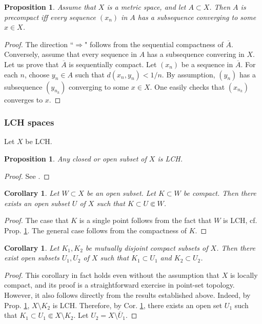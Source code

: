 \documentclass[12pt,b5paper,notitlepage]{article}
\theoremstyle{definition}
\theoremstyle{plain}
\newtheorem{pp}[df]{Proposition}
\newtheorem{co}[df]{Corollary}
\newcommand{\ovl}{\overline}
\numberwithin{equation}{section}
\begin{document}
\begin{pp}\label{lb180}
Assume that $X$ is a metric space, and let $A\subset X$. Then $A$ is precompact iff every sequence $(x_n)$ in $A$ has a subsequence converging to some $x\in X$. 
\end{pp}

\begin{proof}
The direction ``$\Rightarrow$" follows from the sequential compactness of $\ovl A$. Conversely, assume that every sequence in $A$ has a subsequence convering in $X$. Let us prove that $\ovl A$ is sequentially compact. Let $(x_n)$ be a sequence in $\ovl A$. For each $n$, choose $y_n\in A$ such that $d(x_n,y_n)<1/n$. By assumption, $(y_n)$ has a subsequence $(y_{n_k})$ converging to some $x\in X$. One easily checks that $(x_{n_k})$ converges to $x$.
\end{proof}




\subsubsection{LCH spaces}

Let $X$ be LCH.

\begin{pp}\label{lb3}
Any closed or open subset of $X$ is LCH.
\end{pp}

\begin{proof}
See \cite[Subsec. 8.6.2]{Gui-A}.
\end{proof}

\begin{co}\label{lb54}
Let $W\subset X$ be an open subset. Let $K\subset W$ be compact. Then there exists an open subset $U$ of $X$ such that $K\subset U\Subset W$. 
\end{co}
\begin{proof}
The case that $K$ is a single point follows from the fact that $W$ is LCH, cf. Prop. \ref{lb3}. The general case follows from the compactness of $K$.
\end{proof}

\begin{co}\label{lb102}
Let $K_1,K_2$ be mutually disjoint compact subsets of $X$. Then there exist open subsets $U_1,U_2$ of $X$ such that $K_1\subset U_1$ and $K_2\subset U_2$.
\end{co}

\begin{proof}
This corollary in fact holds even without the assumption that $X$ is locally compact, and its proof is a straightforward exercise in point-set topology. However, it also follows directly from the results established above. Indeed, by Prop. \ref{lb3}, $X\setminus K_2$ is LCH. Therefore, by Cor. \ref{lb54}, there exists an open set $U_1$ such that $K_1\subset U_1\Subset X\setminus K_2$. Let $U_2=X\setminus\ovl U_1$.
\end{proof}
\end{document}
